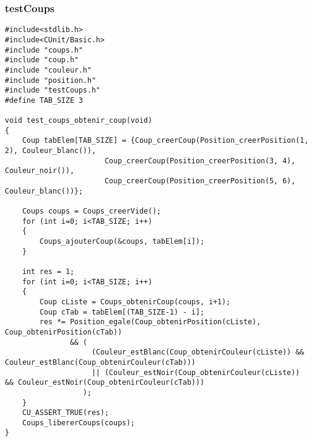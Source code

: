 \subsubsection{testCoups}
\usepackage[T1]{fontenc}
\usepackage[english]{babel}
\usepackage{fullpage}
\usepackage{color}
\usepackage[table]{xcolor}
\usepackage{listings}
 
 
 

 
\begin{lstlisting}
#include<stdlib.h>
#include<CUnit/Basic.h>
#include "coups.h"
#include "coup.h"
#include "couleur.h"
#include "position.h"
#include "testCoups.h"
#define TAB_SIZE 3

void test_coups_obtenir_coup(void)
{
	Coup tabElem[TAB_SIZE] = {Coup_creerCoup(Position_creerPosition(1, 2), Couleur_blanc()),
					   Coup_creerCoup(Position_creerPosition(3, 4), Couleur_noir()),
					   Coup_creerCoup(Position_creerPosition(5, 6), Couleur_blanc())};
	
	Coups coups = Coups_creerVide();
	for (int i=0; i<TAB_SIZE; i++)
	{
		Coups_ajouterCoup(&coups, tabElem[i]);	
	}
	
	int res = 1;
	for (int i=0; i<TAB_SIZE; i++)
	{
		Coup cListe = Coups_obtenirCoup(coups, i+1);
		Coup cTab = tabElem[(TAB_SIZE-1) - i];
		res *= Position_egale(Coup_obtenirPosition(cListe), Coup_obtenirPosition(cTab)) 
			   && (
					(Couleur_estBlanc(Coup_obtenirCouleur(cListe)) && Couleur_estBlanc(Coup_obtenirCouleur(cTab)))
					|| (Couleur_estNoir(Coup_obtenirCouleur(cListe)) && Couleur_estNoir(Coup_obtenirCouleur(cTab)))
				  );
	}
	CU_ASSERT_TRUE(res);
	Coups_libererCoups(coups);
}
\end{lstlisting}
 
